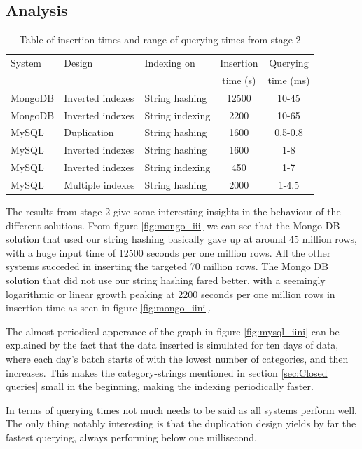 \subsection{Analysis}
\begin{table}
\caption{Table of insertion times and range of querying times from stage 2}
\centering
\begin{tabular}{l|l|l|c|c}
\hline\hline
System       & Design            & Indexing on     & Insertion  &  Querying \\
             &                   &                 & time (s)   & time (ms)  \\
\hline
MongoDB      &  Inverted indexes & String hashing  & 12500      & 10-45     \\
MongoDB      &  Inverted indexes & String indexing & 2200       & 10-65     \\
MySQL        &  Duplication      & String hashing  & 1600       & 0.5-0.8   \\
MySQL        &  Inverted indexes & String hashing  & 1600       & 1-8       \\
MySQL        &  Inverted indexes & String indexing & 450        & 1-7       \\
MySQL        &  Multiple indexes & String hashing  & 2000       & 1-4.5     \\
\hline
\end{tabular}
\end{table}
The results from stage 2 give some interesting insights in the behaviour of the different solutions. From figure \ref{fig:mongo_iii} we can see that the Mongo DB solution that used our string hashing basically gave up at around 45 million rows, with a huge input time of 12500 seconds per one million rows. All the other systems succeded in inserting the targeted 70 million rows. The Mongo DB solution that did not use our string hashing fared better, with a seemingly logarithmic or linear growth peaking at 2200 seconds per one million rows in insertion time as seen in figure \ref{fig:mongo_iini}.

The almost periodical apperance of the graph in figure \ref{fig:mysql_iini} can be explained by the fact that the data inserted is simulated for ten days of data, where each day's batch starts of with the lowest number of categories, and then increases. This makes the category-strings mentioned in section \ref{sec:Closed queries} small in the beginning, making the indexing periodically faster. 

In terms of querying times not much needs to be said as all systems perform well. The only thing notably interesting is that the duplication design yields by far the fastest querying, always performing below one millisecond.

